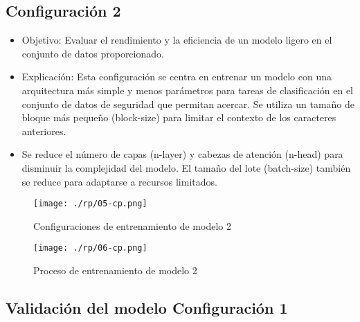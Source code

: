\subsection{Configuración 2}\label{section:Configuración de los parámetros del código} 
    \begin{itemize}
        \item   Objetivo: Evaluar el rendimiento y la eficiencia de un modelo ligero en el conjunto de datos proporcionado.
        \item   Explicación: Esta configuración se centra en entrenar un modelo con una arquitectura más simple y menos parámetros para tareas de clasificación en el conjunto de datos de seguridad que permitan acercar. Se utiliza un tamaño de bloque más pequeño (block-size) para limitar el contexto de los caracteres anteriores. 
        \item   Se reduce el número de capas (n-layer) y cabezas de atención (n-head) para disminuir la complejidad del modelo. El tamaño del lote (batch-size) también se reduce para adaptarse a recursos limitados.
    \end{itemize}
\begin{figure}[H]
   \centering %
       \texttt{[image: ./rp/05-cp.png]} 
   \caption{Configuraciones de entrenamiento de modelo 2  \cite{}}
  \label{figure:Resultado 1}  %
\end{figure}
\begin{figure}[H]
   \centering %
       \texttt{[image: ./rp/06-cp.png]} 
   \caption{Proceso de entrenamiento de modelo 2\cite{}}
  \label{figure:Resultado 1}  %
\end{figure}
\subsection{Validación del modelo Configuración 1}\label{section:Adaptación de modelo nanoGPT}
